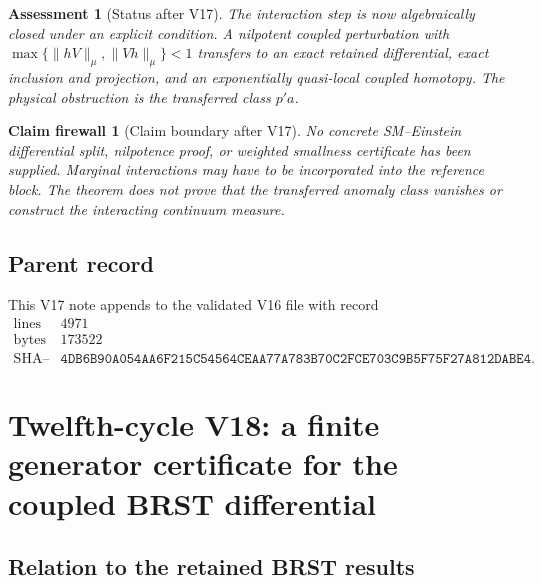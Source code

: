 \documentclass[11pt]{article}
\newtheorem{firewall}[theorem]{Claim firewall}
\newtheorem{assessment}[theorem]{Assessment}
\theoremstyle{remark}
\begin{document}
\begin{assessment}[Status after V17]
\label{ass:v12v17-status}
The interaction step is now algebraically closed under an explicit
condition.  A nilpotent coupled perturbation with
\(\max\{\|hV\|_\mu,\|Vh\|_\mu\}<1\) transfers to an exact retained
differential, exact inclusion and projection, and an exponentially
quasi-local coupled homotopy.  The physical obstruction is the
transferred class \(p'a\).
\end{assessment}

\begin{firewall}[Claim boundary after V17]
\label{fire:v12v17-claim}
No concrete SM--Einstein differential split, nilpotence proof, or
weighted smallness certificate has been supplied.  Marginal
interactions may have to be incorporated into the reference block.
The theorem does not prove that the transferred anomaly class
vanishes or construct the interacting continuum measure.
\end{firewall}

\subsection{Parent record}

This V17 note appends to the validated V16 file with record
\[
\begin{array}{c|c}
\text{lines}&4971\\
\text{bytes}&173522\\
\text{SHA--256}&
\texttt{4DB6B90A054AA6F215C54564CEAA77A783B70C2FCE703C9B5F75F27A812DABE4}.
\end{array}
\]


\section{Twelfth-cycle V18: a finite generator certificate for the
coupled BRST differential}
\label{sec:v12v18}

\subsection{Relation to the retained BRST results}
\end{document}

